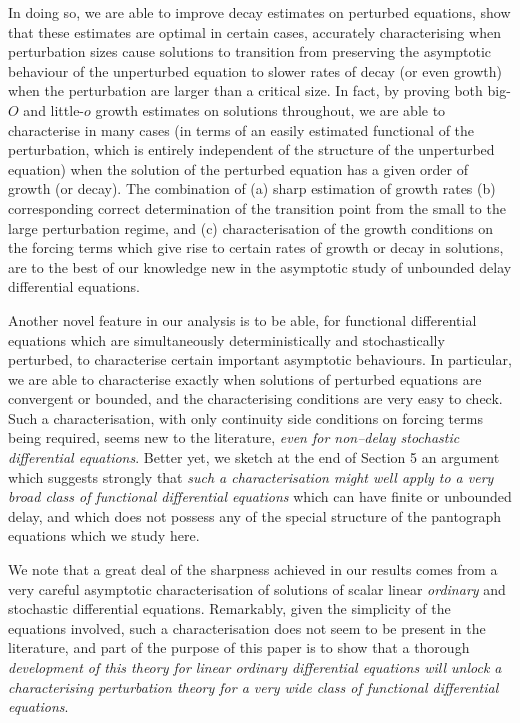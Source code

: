 \documentclass[a4paper,10pt,reqno]{amsart}
\numberwithin{equation}{section}
\theoremstyle{definition}
\theoremstyle{remark}
\DeclareMathOperator{\1}{\mathbbm 1}
\begin{document}
	In doing so, we are able to improve decay estimates on perturbed equations, show that these estimates are optimal in certain cases, accurately characterising when perturbation sizes cause solutions to transition from preserving the asymptotic behaviour of the unperturbed equation to slower rates of decay (or even growth) when the perturbation are larger than a critical size. In fact, by proving both big-$O$ and little-$o$ growth estimates on solutions throughout, we are able to characterise in many cases (in terms of an easily estimated functional of the perturbation, which is entirely independent of the structure of the unperturbed equation) when the solution of the perturbed equation has a given order of growth (or decay). The combination of (a) sharp estimation of growth rates (b) corresponding  correct determination of the transition point from the small to the large perturbation regime, and (c) characterisation of the growth conditions on the forcing terms which give rise to certain rates of growth or decay in solutions, are to the best of our knowledge new in the asymptotic study of unbounded delay differential equations. 
	
	Another novel feature in our analysis is to be able, for functional differential equations which are simultaneously deterministically and stochastically perturbed, to characterise certain important asymptotic behaviours. In particular, we are able to characterise exactly when solutions of perturbed equations are convergent or bounded, and the characterising conditions are very easy to check. Such a characterisation, with only continuity side conditions on forcing terms being required, seems new to the literature, \textit{even for non--delay stochastic differential equations}. Better yet, we sketch at the end of Section 5 an argument which suggests strongly that \textit{such a characterisation might well apply to a very broad class of functional differential equations} which can have finite or unbounded delay, and which does not possess any of the special structure of the pantograph equations which we study here. 
	
	We note that a great deal of the sharpness achieved in our results comes from a very careful asymptotic characterisation of solutions of scalar linear \textit{ordinary} and stochastic differential equations. Remarkably, given the simplicity of the equations involved, such a characterisation does not seem to be present in the literature, and part of the purpose of this paper is to show that a thorough \textit{development of this theory for linear ordinary differential equations will unlock a characterising perturbation theory for a very wide class of functional differential equations}. 
	
\end{document}
